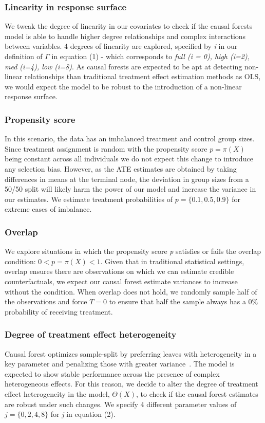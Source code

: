 \documentclass[12pt]{article}
\begin{document}
\subsubsection{Linearity in response surface} 
We tweak the degree of linearity in our covariates to check if the causal forests model is able to handle higher degree relationships and complex interactions between variables. 4 degrees of linearity are explored, specified by \textit{i} in our definition of $\Gamma$ in equation (1) - which corresponds to \textit{full (i = 0), high (i=2), med (i=4), low (i=8)}. As causal forests are expected to be apt at detecting non-linear relationships than traditional treatment effect estimation methods as OLS, we would expect the model to be robust to the introduction of a non-linear response surface. 

\subsubsection{Propensity score} 
In this scenario, the data has an imbalanced treatment and control group sizes. Since treatment assignment is random with the propensity score $p = \pi(X)$ being constant across all individuals we do not expect this change to introduce any selection bias. However, as the ATE estimates are obtained by taking differences in means at the terminal node, the deviation in group sizes from a 50/50 split will likely harm the power of our model and increase the variance in our estimates. We estimate treatment probabilities of $p = \{0.1, 0.5, 0.9\}$ for extreme cases of imbalance. 

\subsubsection{Overlap}
We explore situations in which the propensity score \textit{p} satisfies or fails the overlap condition: $0 < p = \pi(X) < 1$. Given that in traditional statistical settings, overlap ensures there are observations on which we can estimate credible counterfactuals, we expect our causal forest estimate variances to increase without the condition. When overlap does not hold, we randomly sample half of the observations and force $T = 0$ to ensure that half the sample always has a 0\% probability of receiving treatment. 

\subsubsection{Degree of treatment effect heterogeneity} 
Causal forest optimizes sample-split by preferring leaves with heterogeneity in a key parameter and penalizing those with greater variance~\cite{athey2018grf}. The model is expected to show stable performance across the presence of complex heterogeneous effects. For this reason, we decide to alter the degree of treatment effect heterogeneity in the model, $\Theta(X)$, to check if the causal forest estimates are robust under such changes. We specify 4 different parameter values of $j = \{0,2,4,8\}$ for \textit{j} in equation (2). 
\end{document}
